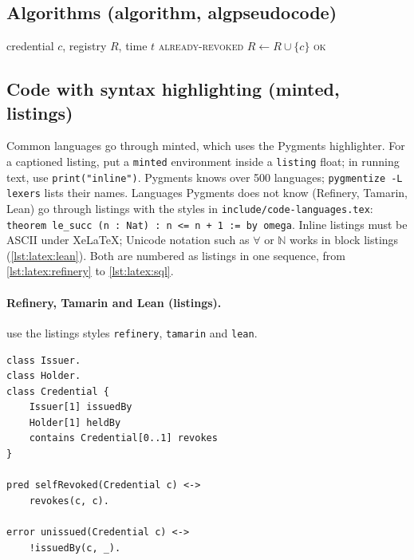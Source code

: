 \subsection{Algorithms (algorithm, algpseudocode)}\label{app:latex:alg}
\begin{algorithm}[!ht]
  \caption{Revocation with a freshness check}\label{alg:latex:revoke}
  \begin{algorithmic}[1]
    \Require credential $c$, registry $R$, time $t$
      \State \Return \textsc{already-revoked}
    \EndIf
    \State $R \gets R \cup \{c\}$ 
    \State \Return \textsc{ok}
  \end{algorithmic}
\end{algorithm}

\subsection{Code with syntax highlighting (minted, listings)}\label{app:latex:code}
Common languages go through minted, which uses the Pygments highlighter.
For a captioned listing, put a \texttt{minted} environment inside a \texttt{listing} float; in running text, use \texttt{print("inline")}.
Pygments knows over 500 languages; \texttt{pygmentize -L lexers} lists their names.
Languages Pygments does not know (Refinery, Tamarin, Lean) go through listings with the styles in \texttt{include/code-languages.tex}: \lstinline[style=lean]{theorem le_succ (n : Nat) : n <= n + 1 := by omega}.
Inline listings must be ASCII under XeLaTeX; Unicode notation such as $\forall$ or $\mathbb{N}$ works in block listings (\cref{lst:latex:lean}).
Both are numbered as listings in one sequence, from \cref{lst:latex:refinery} to \cref{lst:latex:sql}.

\paragraph{Refinery, Tamarin and Lean (listings).}
 use the listings styles \texttt{refinery}, \texttt{tamarin} and \texttt{lean}.
\begin{lstlisting}[style=refinery, float=tbp, morekeywords={[2]Credential,Issuer,Holder}, caption={Refinery: a credential metamodel with an error predicate.}, label={lst:latex:refinery}]
class Issuer.
class Holder.
class Credential {
    Issuer[1] issuedBy
    Holder[1] heldBy
    contains Credential[0..1] revokes
}

pred selfRevoked(Credential c) <->
    revokes(c, c).

error unissued(Credential c) <->
    !issuedBy(c, _).
\end{lstlisting}


